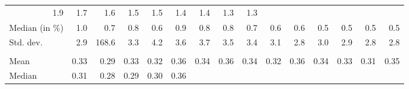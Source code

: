\begin{tabular}{lllllllllllllll}
  \multicolumn{1}{r}{1.9} &
  \multicolumn{1}{r}{1.7} &
  \multicolumn{1}{r}{1.6} &
  \multicolumn{1}{r}{1.5} &
  \multicolumn{1}{r}{1.5} &
  \multicolumn{1}{r}{1.4} &
  \multicolumn{1}{r}{1.4} &
  \multicolumn{1}{r}{1.3} &
  \multicolumn{1}{r}{1.3} \\
\multicolumn{1}{l}{\hspace{2em}Median (in $\%$)} &
  \multicolumn{1}{|r}{1.0} &
  \multicolumn{1}{r}{0.7} &
  \multicolumn{1}{r}{0.8} &
  \multicolumn{1}{r}{0.6} &
  \multicolumn{1}{r}{0.9} &
  \multicolumn{1}{r}{0.8} &
  \multicolumn{1}{r}{0.8} &
  \multicolumn{1}{r}{0.7} &
  \multicolumn{1}{r}{0.6} &
  \multicolumn{1}{r}{0.6} &
  \multicolumn{1}{r}{0.5} &
  \multicolumn{1}{r}{0.5} &
  \multicolumn{1}{r}{0.5} &
  \multicolumn{1}{r}{0.5} \\
\multicolumn{1}{l}{\hspace{2em}Std. dev.} &
  \multicolumn{1}{|r}{2.9} &
  \multicolumn{1}{r}{168.6} &
  \multicolumn{1}{r}{3.3} &
  \multicolumn{1}{r}{4.2} &
  \multicolumn{1}{r}{3.6} &
  \multicolumn{1}{r}{3.7} &
  \multicolumn{1}{r}{3.5} &
  \multicolumn{1}{r}{3.4} &
  \multicolumn{1}{r}{3.1} &
  \multicolumn{1}{r}{2.8} &
  \multicolumn{1}{r}{3.0} &
  \multicolumn{1}{r}{2.9} &
  \multicolumn{1}{r}{2.8} &
  \multicolumn{1}{r}{2.8} \\
\multicolumn{1}{l}{\hspace{1em}{\textit{Elasticity} ($\widehat{\beta}$)}} &
  \multicolumn{1}{|r}{} &
  \multicolumn{1}{r}{} &
  \multicolumn{1}{r}{} &
  \multicolumn{1}{r}{} &
  \multicolumn{1}{r}{} &
  \multicolumn{1}{r}{} &
  \multicolumn{1}{r}{} &
  \multicolumn{1}{r}{} &
  \multicolumn{1}{r}{} &
  \multicolumn{1}{r}{} &
  \multicolumn{1}{r}{} &
  \multicolumn{1}{r}{} &
  \multicolumn{1}{r}{} &
  \multicolumn{1}{r}{} \\
\multicolumn{1}{l}{\hspace{2em}Mean} &
  \multicolumn{1}{|r}{0.33} &
  \multicolumn{1}{r}{0.29} &
  \multicolumn{1}{r}{0.33} &
  \multicolumn{1}{r}{0.32} &
  \multicolumn{1}{r}{0.36} &
  \multicolumn{1}{r}{0.34} &
  \multicolumn{1}{r}{0.36} &
  \multicolumn{1}{r}{0.34} &
  \multicolumn{1}{r}{0.32} &
  \multicolumn{1}{r}{0.36} &
  \multicolumn{1}{r}{0.34} &
  \multicolumn{1}{r}{0.33} &
  \multicolumn{1}{r}{0.31} &
  \multicolumn{1}{r}{0.35} \\
\multicolumn{1}{l}{\hspace{2em}Median} &
  \multicolumn{1}{|r}{0.31} &
  \multicolumn{1}{r}{0.28} &
  \multicolumn{1}{r}{0.29} &
  \multicolumn{1}{r}{0.30} &
  \multicolumn{1}{r}{0.36} &

\end{tabular}
